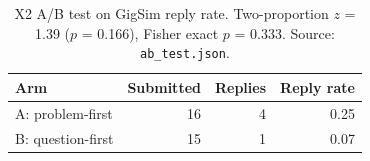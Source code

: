 \begin{table}[t]\centering\small\caption{X2 A/B test on GigSim reply rate. Two-proportion $z$ = 1.39 ($p$ = 0.166), Fisher exact $p$ = 0.333. Source: \texttt{ab\_test.json}.}\label{tab:ab}
\begin{tabular}{lrrr}\toprule Arm & Submitted & Replies & Reply rate\\\midrule
A: problem-first & 16 & 4 & 0.25 \\
B: question-first & 15 & 1 & 0.07 \\
\bottomrule\end{tabular}\end{table}